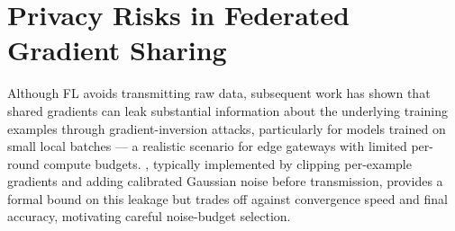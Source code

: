\section{Privacy Risks in Federated Gradient Sharing}
Although FL avoids transmitting raw data, subsequent work has shown that shared
gradients can leak substantial information about the underlying training examples
through gradient-inversion attacks, particularly for models trained on small local
batches — a realistic scenario for edge gateways with limited per-round compute
budgets. , typically implemented by clipping
per-example gradients and adding calibrated Gaussian noise before transmission,
provides a formal bound on this leakage but trades off against convergence speed and
final accuracy, motivating careful noise-budget selection.
